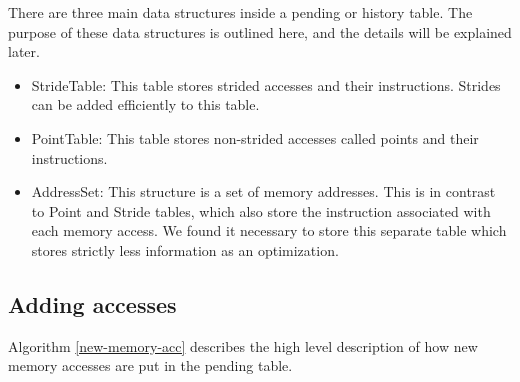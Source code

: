 \documentclass[12pt,twoside]{reedthesis}
\begin{document}
			There are three main data structures inside a pending or history table. The purpose of these data structures is outlined here, and the details will be explained later. 
			
			\begin{itemize}
				\item StrideTable: This table stores strided accesses and their instructions. Strides can be added efficiently to this table.
				\item PointTable: This table stores non-strided accesses called points and their instructions. 
				\item AddressSet: This structure is a set of memory addresses.
				This is in contrast to Point and Stride tables, which also store the instruction associated with each memory access. We found it necessary to store this separate table which stores strictly less information as an optimization. %
			\end{itemize}
		
			
			
			
			
		\subsection{Adding accesses}\label{s:add-accesses}
		
		Algorithm \ref{new-memory-acc} describes the high level description of how new memory accesses are put in the pending table. %
		
\end{document}

